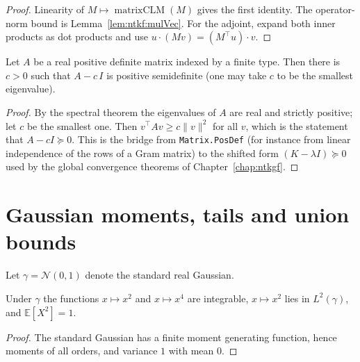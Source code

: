 \begin{proof}
  \leanok
Linearity of $M\mapsto\operatorname{matrixCLM}(M)$ gives the first identity. The operator-norm
bound is Lemma~\ref{lem:ntkf:mulVec}. For the adjoint, expand both inner products as dot products
and use $u\cdot(Mv)=(M^\top u)\cdot v$.
\end{proof}

\begin{theorem}\label{thm:ntkf:spectralGap}
  \leanok
Let $A$ be a real positive definite matrix indexed by a finite type. Then there is $c>0$ such that
$A-c\,I$ is positive semidefinite (one may take $c$ to be the smallest eigenvalue).
\end{theorem}

\begin{proof}
  \leanok
By the spectral theorem the eigenvalues of $A$ are real and strictly positive; let $c$ be the
smallest one. Then $v^\top Av\ge c\|v\|^2$ for all $v$, which is the statement that
$A-cI\succeq 0$. This is the bridge from \texttt{Matrix.PosDef} (for instance from
linear independence of the rows of a Gram matrix) to the shifted form
$(K-\lambda I)\succeq 0$ used by the global convergence theorems of
Chapter~\ref{chap:ntkgf}.
\end{proof}


\section{Gaussian moments, tails and union bounds}\label{sec:ntkf:gaussian}

Let $\gamma=\mathcal N(0,1)$ denote the standard real Gaussian.

\begin{lemma}\label{lem:ntkf:gaussMoments}
  \leanok
Under $\gamma$ the functions $x\mapsto x^2$ and $x\mapsto x^4$ are integrable, $x\mapsto x^2$ lies
in $L^2(\gamma)$, and $\mathbb E[X^2]=1$.
\end{lemma}

\begin{proof}
  \leanok
The standard Gaussian has a finite moment generating function, hence moments of all orders, and
variance $1$ with mean $0$.
\end{proof}

